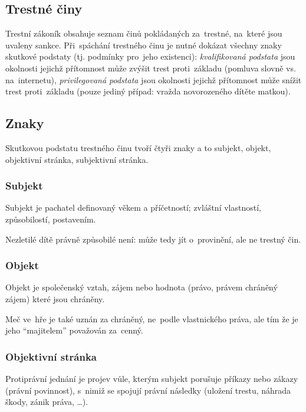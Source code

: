 \subsection{Trestné činy}

Trestní zákoník obsahuje seznam činů pokládaných za~trestné, na~které jsou uvaleny sankce.
Při~spáchání trestného činu je nutné dokázat všechny znaky skutkové podstaty (tj. podmínky pro~jeho existenci):
\emph{kvalifikovaná podstata} jsou okolnosti jejichž přítomnost může zvýšit trest proti~základu (pomluva slovně vs. na~internetu),
\emph{privilegovaná podstata} jsou okolnosti jejichž přítomnost může snížit trest proti~základu (pouze jediný případ: vražda novorozeného dítěte matkou).

\subsection{Znaky}

Skutkovou podstatu trestného činu tvoří čtyři znaky a to subjekt, objekt, objektivní stránka, subjektivní stránka.

\subsubsection{Subjekt}

Subjekt je pachatel definovaný věkem a příčetností; zvláštní vlastností, způsobilostí, postavením.

Nezletilé dítě právně způsobilé není: může tedy jít o~provinění, ale ne trestný čin.


\subsubsection{Objekt}

Objekt je společenský vztah, zájem nebo hodnota (právo, právem chráněný zájem) které jsou chráněny.

Meč ve~hře je také uznán za chráněný, ne~podle vlastnického práva, ale tím že je jeho \enquote{majitelem} považován za~cenný.


\subsubsection{Objektivní stránka}

Protiprávní jednání je projev vůle, kterým subjekt porušuje příkazy nebo zákazy (právní povinnost), s~nimiž se spojují právní následky (uložení trestu, náhrada škody, zánik práva, \dots).

